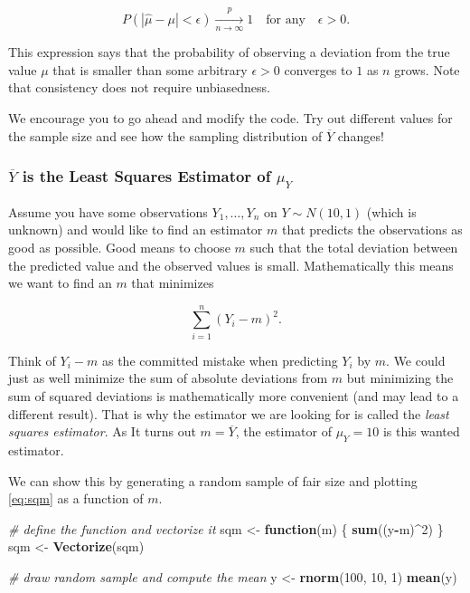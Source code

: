 \documentclass[]{book}
\newenvironment{Shaded}{\begin{snugshade}}{\end{snugshade}}
\newcommand{\KeywordTok}[1]{\textcolor[rgb]{0.13,0.29,0.53}{\textbf{#1}}}
\newcommand{\DecValTok}[1]{\textcolor[rgb]{0.00,0.00,0.81}{#1}}
\newcommand{\StringTok}[1]{\textcolor[rgb]{0.31,0.60,0.02}{#1}}
\newcommand{\CommentTok}[1]{\textcolor[rgb]{0.56,0.35,0.01}{\textit{#1}}}
\newcommand{\ControlFlowTok}[1]{\textcolor[rgb]{0.13,0.29,0.53}{\textbf{#1}}}
\newcommand{\OperatorTok}[1]{\textcolor[rgb]{0.81,0.36,0.00}{\textbf{#1}}}
\newcommand{\NormalTok}[1]{#1}
\theoremstyle{definition}
\theoremstyle{definition}
\theoremstyle{definition}
\theoremstyle{remark}
\begin{document}
\[ P(|\hat{\mu} - \mu|<\epsilon) \xrightarrow[n \rightarrow \infty]{p} 1 \quad \text{for any}\quad\epsilon>0.\]

This expression says that the probability of observing a deviation from
the true value \(\mu\) that is smaller than some arbitrary
\(\epsilon > 0\) converges to \(1\) as \(n\) grows. Note that
consistency does not require unbiasedness.

We encourage you to go ahead and modify the code. Try out different
values for the sample size and see how the sampling distribution of
\(\overline{Y}\) changes!

\subsubsection*{\texorpdfstring{\(\overline{Y}\) is the Least Squares
Estimator of
\(\mu_Y\)}{\textbackslash{}overline\{Y\} is the Least Squares Estimator of \textbackslash{}mu\_Y}}\label{overliney-is-the-least-squares-estimator-of-mu_y}

Assume you have some observations \(Y_1,\dots,Y_n\) on
\(Y \sim N(10,1)\) (which is unknown) and would like to find an
estimator \(m\) that predicts the observations as good as possible. Good
means to choose \(m\) such that the total deviation between the
predicted value and the observed values is small. Mathematically this
means we want to find an \(m\) that minimizes

\begin{equation}
  \sum_{i=1}^n (Y_i - m)^2. \label{eq:sqm}
\end{equation}

Think of \(Y_i - m\) as the committed mistake when predicting \(Y_i\) by
\(m\). We could just as well minimize the sum of absolute deviations
from \(m\) but minimizing the sum of squared deviations is
mathematically more convenient (and may lead to a different result).
That is why the estimator we are looking for is called the \emph{least
squares estimator}. As It turns out \(m = \overline{Y}\), the estimator
of \(\mu_Y=10\) is this wanted estimator.

We can show this by generating a random sample of fair size and plotting
\eqref{eq:sqm} as a function of \(m\).

\begin{Shaded}
\begin{Highlighting}[]
\CommentTok{# define the function and vectorize it}
\NormalTok{sqm <-}\StringTok{ }\ControlFlowTok{function}\NormalTok{(m) \{}
 \KeywordTok{sum}\NormalTok{((y}\OperatorTok{-}\NormalTok{m)}\OperatorTok{^}\DecValTok{2}\NormalTok{)}
\NormalTok{\}}
\NormalTok{sqm <-}\StringTok{ }\KeywordTok{Vectorize}\NormalTok{(sqm)}

\CommentTok{# draw random sample and compute the mean}
\NormalTok{y <-}\StringTok{ }\KeywordTok{rnorm}\NormalTok{(}\DecValTok{100}\NormalTok{, }\DecValTok{10}\NormalTok{, }\DecValTok{1}\NormalTok{)}
\KeywordTok{mean}\NormalTok{(y)}
\end{Highlighting}
\end{Shaded}
\end{document}
